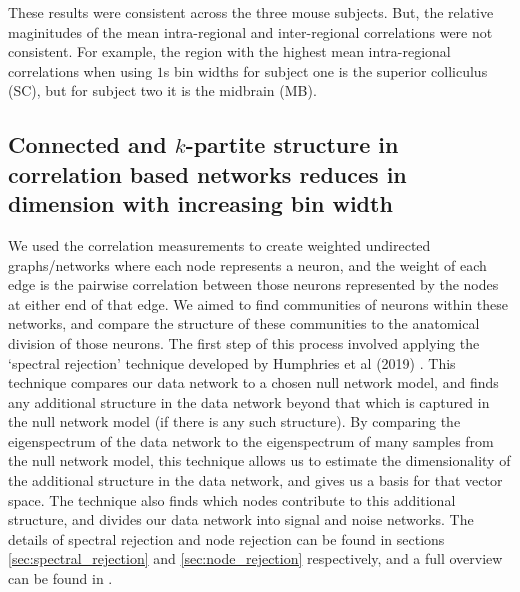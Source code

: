   These results were consistent across the three mouse subjects. But, the relative maginitudes of the mean intra-regional and inter-regional correlations were not consistent. For example, the region with the highest mean intra-regional correlations when using $1$s bin widths for subject one is the superior colliculus (SC), but for subject two it is the midbrain (MB).

  \subsection{Connected and $k$-partite structure in correlation based networks reduces in dimension with increasing bin width}\label{sec:dims_result}
  We used the correlation measurements to create weighted undirected graphs/networks where each node represents a neuron, and the weight of each edge is the pairwise correlation between those neurons represented by the nodes at either end of that edge. We aimed to find communities of neurons within these networks, and compare the structure of these communities to the anatomical division of those neurons. The first step of this process involved applying the `spectral rejection' technique developed by Humphries et al (2019) \parencite{humphries}. This technique compares our data network to a chosen null network model, and finds any additional structure in the data network beyond that which is captured in the null network model (if there is any such structure). By comparing the eigenspectrum of the data network to the eigenspectrum of many samples from the null network model, this technique allows us to estimate the dimensionality of the additional structure in the data network, and gives us a basis for that vector space. The technique also finds which nodes contribute to this additional structure, and divides our data network into signal and noise networks. The details of spectral rejection and node rejection can be found in sections \ref{sec:spectral_rejection} and \ref{sec:node_rejection} respectively, and a full overview can be found in  \parencite{humphries}.

